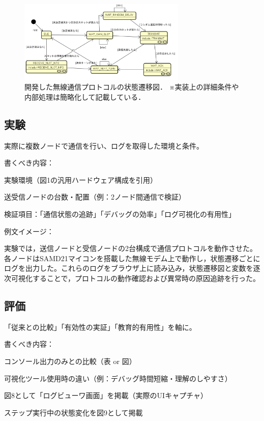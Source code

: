 \documentclass[technicalreport]{ieicej}
\begin{document}
\begin{figure}[b]
  \centering
  \includegraphics[width=80mm]{./images/protocol-state-machine3.png}
  \caption{開発した無線通信プロトコルの状態遷移図．
※実装上の詳細条件や内部処理は簡略化して記載している．}
  \label{fig:protocol-state-machine}
\end{figure}

\subsection{実験}
実際に複数ノードで通信を行い、ログを取得した環境と条件。

書くべき内容：

実験環境（図1の汎用ハードウェア構成を引用）

送受信ノードの台数・配置（例：2ノード間通信で検証）

検証項目：「通信状態の追跡」「デバッグの効率」「ログ可視化の有用性」

例文イメージ：

実験では，送信ノードと受信ノードの2台構成で通信プロトコルを動作させた。各ノードはSAMD21マイコンを搭載した無線モデム上で動作し，状態遷移ごとにログを出力した。これらのログをブラウザ上に読み込み，状態遷移図と変数を逐次可視化することで，プロトコルの動作確認および異常時の原因追跡を行った。

\subsection{評価}
「従来との比較」「有効性の実証」「教育的有用性」を軸に。

書くべき内容：

コンソール出力のみとの比較（表 or 図）

可視化ツール使用時の違い（例：デバッグ時間短縮・理解のしやすさ）

図8として「ログビューワ画面」を掲載（実際のUIキャプチャ）

ステップ実行中の状態変化を図9として掲載
\end{document}
